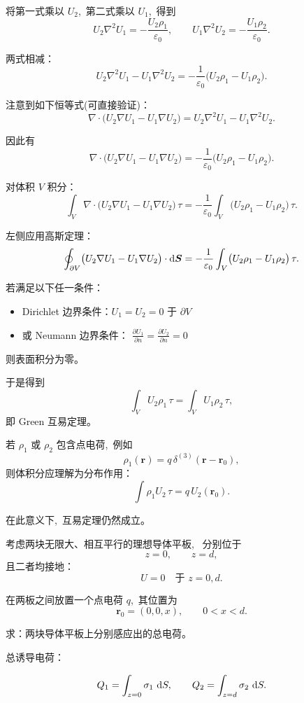 将第一式乘以 \(U_2\), \,第二式乘以 \(U_1\), \,得到
\[
U_2\nabla^2 U_1
=
-\frac{U_2\rho_1}{\varepsilon_0},
\qquad
U_1\nabla^2 U_2
=
-\frac{U_1\rho_2}{\varepsilon_0}.
\]

两式相减：
\[
U_2\nabla^2 U_1 - U_1\nabla^2 U_2
=
-\frac{1}{\varepsilon_0}
\bigl(
U_2\rho_1 - U_1\rho_2
\bigr).
\]

注意到如下恒等式(可直接验证)：
\[
\nabla\cdot
\bigl(
U_2\nabla U_1 - U_1\nabla U_2
\bigr)
=
U_2\nabla^2 U_1 - U_1\nabla^2 U_2.
\]

因此有
\[
\nabla\cdot
\bigl(
U_2\nabla U_1 - U_1\nabla U_2
\bigr)
=
-\frac{1}{\varepsilon_0}
\bigl(
U_2\rho_1 - U_1\rho_2
\bigr).
\]

对体积 \(V\) 积分：
\[
\int_V
\nabla\cdot
\bigl(
U_2\nabla U_1 - U_1\nabla U_2
\bigr)\,\tau
=
-\frac{1}{\varepsilon_0}
\int_V
\bigl(
U_2\rho_1 - U_1\rho_2
\bigr)\,\tau.
\]

左侧应用高斯定理：
\[
\oint_{\partial V}
\bigl(
U_2\nabla U_1 - U_1\nabla U_2
\bigr)\cdot\dif\boldsymbol  S
=
-\frac{1}{\varepsilon_0}
\int_V
\bigl(
U_2\rho_1 - U_1\rho_2
\bigr)\,\tau.
\]

若满足以下任一条件：

\begin{itemize}
  \item Dirichlet 边界条件：\(U_1 = U_2 = 0\) 于 \(\partial V\)
  \item 或 Neumann 边界条件：
  \(\displaystyle \frac{\partial U_1}{\partial n}
  =
  \frac{\partial U_2}{\partial n}
  = 0\)
\end{itemize}

则表面积分为零。

于是得到
\[
\int_V
U_2\rho_1\,\tau
=
\int_V
U_1\rho_2\,\tau,
\]
即 Green 互易定理。

若 \(\rho_1\) 或 \(\rho_2\) 包含点电荷, \,例如
\[
\rho_1(\boldsymbol  r)
=
q\,\delta^{(3)}(\boldsymbol  r-\boldsymbol  r_0),
\]
则体积分应理解为分布作用：
\[
\int \rho_1 U_2\,\tau
=
q\,U_2(\boldsymbol  r_0).
\]

在此意义下, \,互易定理仍然成立。

考虑两块无限大、相互平行的理想导体平板, \,
分别位于
\[
z=0,\qquad z=d,
\]
且二者均接地：
\[
U=0 \quad \text{于 } z=0,d.
\]

在两板之间放置一个点电荷 \(q\), \,其位置为
\[
\boldsymbol  r_0=(0,0,x),\qquad 0<x<d.
\]

求：两块导体平板上分别感应出的总电荷。

总诱导电荷：

\[
Q_1=\int_{z=0}\sigma_1\,\dif S,
\qquad
Q_2=\int_{z=d}\sigma_2\,\dif S.
\]

